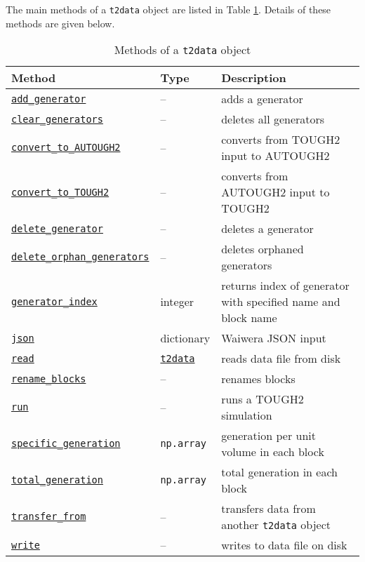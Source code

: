 The main methods of a \texttt{t2data} object are listed in Table \ref{tb:t2data_methods}.  Details of these methods are given below.

\begin{table}
  \begin{center}
    \begin{tabular}{|l|l|p{65mm}|}
      \hline
      \textbf{Method} & \textbf{Type} & \textbf{Description}\\
      \hline
      \hyperref[sec:t2data:add_generator]{\texttt{add\_generator}} & -- & adds a generator\\
      \hyperref[sec:t2data:clear_generators]{\texttt{clear\_generators}} & -- & deletes all generators\\
      \hyperref[sec:t2data:convert_to_AUTOUGH2]{\texttt{convert\_to\_AUTOUGH2}} & -- & converts from TOUGH2 input to AUTOUGH2\\
      \hyperref[sec:t2data:convert_to_TOUGH2]{\texttt{convert\_to\_TOUGH2}} & -- & converts from AUTOUGH2 input to TOUGH2\\
      \hyperref[sec:t2data:delete_generator]{\texttt{delete\_generator}} & -- & deletes a generator\\
      \hyperref[sec:t2data:delete_orphan_generators]{\texttt{delete\_orphan\_generators}} & -- & deletes orphaned generators\\
      \hyperref[sec:t2data:generator_index]{\texttt{generator\_index}} & integer & returns index of generator with specified name and block name\\
      \hyperref[sec:t2data:json]{\texttt{json}} & dictionary & Waiwera JSON input \\
      \hyperref[sec:t2data:read]{\texttt{read}} & \hyperref[datafiles]{\texttt{t2data}} & reads data file from disk\\
      \hyperref[sec:t2data:rename_blocks]{\texttt{rename\_blocks}} & -- & renames blocks\\
      \hyperref[sec:t2data:run]{\texttt{run}} & -- & runs a TOUGH2 simulation\\
      \hyperref[sec:t2data:specific_generation]{\texttt{specific\_generation}} & \texttt{np.array} & generation per unit volume in each block\\
      \hyperref[sec:t2data:total_generation]{\texttt{total\_generation}} & \texttt{np.array} & total generation in each block\\
      \hyperref[sec:t2data:transfer_from]{\texttt{transfer\_from}} & -- & transfers data from another \texttt{t2data} object\\
      \hyperref[sec:t2data:write]{\texttt{write}} & -- & writes to data file on disk\\
      \hline
    \end{tabular}
    \caption{Methods of a \texttt{t2data} object}
    \label{tb:t2data_methods}
  \end{center}
\end{table}

